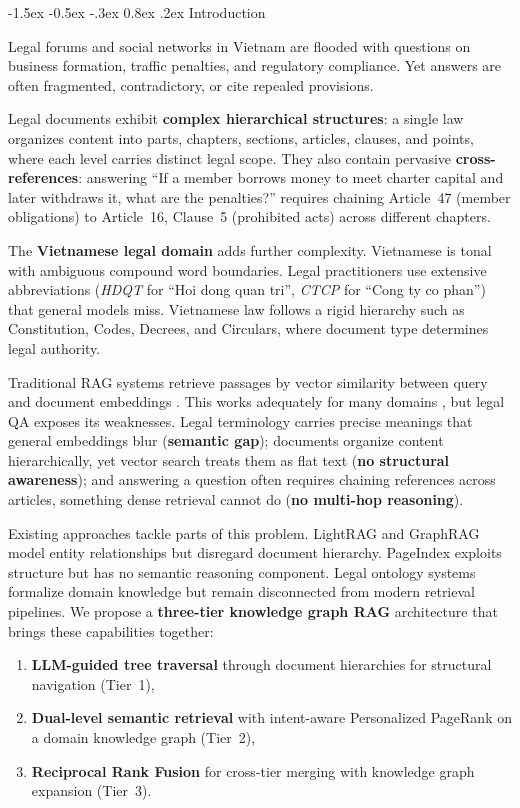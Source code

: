 \documentclass{IOS-Book-Article}
\makeatletter
\renewcommand\section{\@startsection{section}{1}{\z@}%
  {-1.5ex \@plus -0.5ex \@minus -.3ex}%
  {0.8ex \@plus .2ex}%
  {\normalfont\large\bfseries}}
\makeatother
\begin{document}
\section{Introduction}

Legal forums and social networks in Vietnam are flooded with questions on business formation, traffic penalties, and regulatory compliance. Yet answers are often fragmented, contradictory, or cite repealed provisions.

Legal documents exhibit \textbf{complex hierarchical structures}: a single law organizes content into parts, chapters, sections, articles, clauses, and points, where each level carries distinct legal scope. They also contain pervasive \textbf{cross-references}: answering ``If a member borrows money to meet charter capital and later withdraws it, what are the penalties?'' requires chaining Article~47 (member obligations) to Article~16, Clause~5 (prohibited acts) across different chapters.

The \textbf{Vietnamese legal domain} adds further complexity. Vietnamese is tonal with ambiguous compound word boundaries. Legal practitioners use extensive abbreviations (\textit{HDQT} for ``Hoi dong quan tri'', \textit{CTCP} for ``Cong ty co phan'') that general models miss. Vietnamese law follows a rigid hierarchy such as Constitution, Codes, Decrees, and Circulars, where document type determines legal authority.

Traditional RAG systems \cite{r1} retrieve passages by vector similarity between query and document embeddings \cite{r2}. This works adequately for many domains \cite{r3,r4}, but legal QA exposes its weaknesses. Legal terminology carries precise meanings that general embeddings blur (\textbf{semantic gap}); documents organize content hierarchically, yet vector search treats them as flat text (\textbf{no structural awareness}); and answering a question often requires chaining references across articles, something dense retrieval cannot do (\textbf{no multi-hop reasoning}).

Existing approaches tackle parts of this problem. LightRAG \cite{r5} and GraphRAG \cite{r6} model entity relationships but disregard document hierarchy. PageIndex \cite{r7} exploits structure but has no semantic reasoning component. Legal ontology systems \cite{r8,r9} formalize domain knowledge but remain disconnected from modern retrieval pipelines. We propose a \textbf{three-tier knowledge graph RAG} architecture that brings these capabilities together:
\begin{enumerate}
\item \textbf{LLM-guided tree traversal} through document hierarchies for structural navigation (Tier~1),
\item \textbf{Dual-level semantic retrieval} with intent-aware Personalized PageRank on a domain knowledge graph (Tier~2),
\item \textbf{Reciprocal Rank Fusion} for cross-tier merging with knowledge graph expansion (Tier~3).
\end{enumerate}
\end{document}
